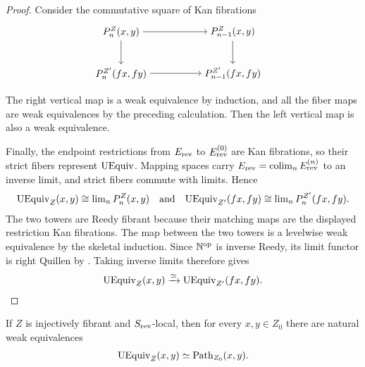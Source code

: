 \documentclass[a4paper,dvipdfmx,11pt]{amsart}
\begin{document}
\begin{proof}
  Consider the commutative square of Kan fibrations
  \begin{align*}
    &\begin{tikzpicture}[auto]
      \node (stage) at (0,1.5) {$P_n^Z(x,y)$};
      \node (previous-stage) at (4,1.5) {$P_{n-1}^Z(x,y)$};
      \node (target-stage) at (0,0) {$P_n^{Z'}(fx,fy)$};
      \node (target-previous-stage) at (4,0)
        {$P_{n-1}^{Z'}(fx,fy)$};
      \draw[->]
        (stage) -- (previous-stage);
      \draw[->]
        (stage) -- (target-stage);
      \draw[->]
        (previous-stage) -- (target-previous-stage);
      \draw[->]
        (target-stage) -- (target-previous-stage);
    \end{tikzpicture}
  \end{align*}
  The right vertical map is a weak equivalence by induction, and all the fiber maps are weak equivalences by the preceding calculation.
  Then the left vertical map is also a weak equivalence.

  Finally, the endpoint restrictions from $E_{\mathrm{rev}}$ to $E_{\mathrm{rev}}^{(0)}$ are Kan fibrations, so their strict fibers represent $\mathrm{UEquiv}$.
  Mapping spaces carry $E_{\mathrm{rev}}=\operatorname{colim}_nE_{\mathrm{rev}}^{(n)}$ to an inverse limit, and strict fibers commute with limits.
  Hence
  \begin{align}
    \UEquiv_Z(x,y)
    \cong
    \lim_nP_n^Z(x,y)
    \quad \text{and} \quad
    \UEquiv_{Z'}(fx,fy)
    \cong
    \lim_nP_n^{Z'}(fx,fy).
  \end{align}
  The two towers are Reedy fibrant because their matching maps are the displayed restriction Kan fibrations.
  The map between the two towers is a levelwise weak equivalence by the skeletal induction.
  Since $\mathbb{N}^{\operatorname{op}}$ is inverse Reedy, its limit functor is right Quillen by \cite[Proposition~15.10.2 (1) and Theorem~15.10.8 (1)]{Hir02}.
  Taking inverse limits therefore gives
  \begin{align}
    \mathrm{UEquiv}_Z(x,y)
    \xrightarrow{\simeq}
    \mathrm{UEquiv}_{Z'}(fx,fy).
  \end{align}
\end{proof}

\begin{lemma}\label{jt.lem.uequiv-paths}
  If $Z$ is injectively fibrant and $S_{\mathrm{rev}}$-local, then for every $x,y\in Z_0$ there are natural weak equivalences 
  \begin{align}
    \mathrm{UEquiv}_Z(x,y) \simeq \mathrm{Path}_{Z_0}(x,y).
  \end{align}
\end{lemma}
\end{document}
